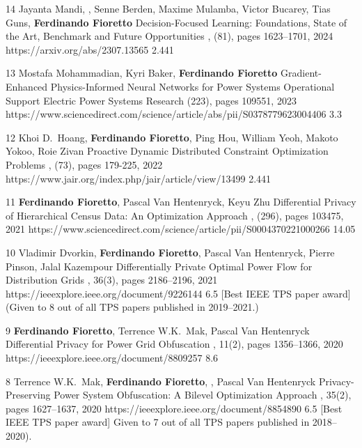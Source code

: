 \begin{pubs}
\journalentryIF
	{14}
	{Jayanta Mandi, , Senne Berden, Maxime Mulamba, Victor Bucarey, Tias Guns, {\bf Ferdinando Fioretto}} 
	{Decision-Focused Learning: Foundations, State of the Art, Benchmark and Future Opportunities}
	{\JAIR, (81), pages 1623--1701, 2024}
	{https://arxiv.org/abs/2307.13565}
	{2.441}

	\journalentryIF
	{13}
	{Mostafa Mohammadian, Kyri Baker, \textbf{Ferdinando Fioretto}}
	{Gradient-Enhanced Physics-Informed Neural Networks for Power Systems Operational Support}
	{Electric Power Systems Research (223), pages 109551, 2023}
	{https://www.sciencedirect.com/science/article/abs/pii/S0378779623004406}
	{3.3}

	\journalentryIF
	{12} %
	{Khoi D.~Hoang, \textbf{Ferdinando Fioretto}, Ping Hou, William Yeoh, Makoto Yokoo, Roie Zivan}
	{Proactive Dynamic Distributed Constraint Optimization Problems}
	{\JAIR, (73), pages 179-225, 2022}
	{https://www.jair.org/index.php/jair/article/view/13499}
	{2.441}

	\journalentryIF
	{11} %
	{\textbf{Ferdinando Fioretto}, Pascal Van Hentenryck, Keyu Zhu}
	{Differential Privacy of Hierarchical Census Data: An Optimization Approach}
	{\AIJ, (296), pages 103475, 2021}
	{https://www.sciencedirect.com/science/article/pii/S0004370221000266}
	{14.05}

	\journalentryIFAwd
	{10} %
	{Vladimir Dvorkin, {\bf Ferdinando Fioretto}, Pascal Van Hentenryck, Pierre Pinson, Jalal Kazempour}
	{Differentially Private Optimal Power Flow for Distribution Grids}
	{\TPS, 36(3), pages 2186--2196, 2021}
	{https://ieeexplore.ieee.org/document/9226144}
	{6.5}
	{[Best IEEE TPS paper award]}
	{(Given to 8 out of all TPS papers published in 2019--2021.)}
	
	\journalentryIF
	{9} %
	{{\bf Ferdinando Fioretto}, Terrence W.K.~Mak, Pascal Van Hentenryck}
	{Differential Privacy for Power Grid Obfuscation}
	{\TSG, 11(2), pages 1356--1366, 2020}
	{https://ieeexplore.ieee.org/document/8809257}
	{8.6}

	\journalentryIFAwd
	{8}	%
	{Terrence W.K.~Mak, {\bf Ferdinando Fioretto}, , Pascal Van Hentenryck}
	{Privacy-Preserving Power System Obfuscation: A Bilevel Optimization Approach}
	{\TPS, 35(2), pages 1627--1637, 2020}
	{https://ieeexplore.ieee.org/document/8854890}
	{6.5}
	{[Best IEEE TPS paper award]}
	{Given to 7 out of all TPS papers published in 2018--2020).}


\end{pubs}
